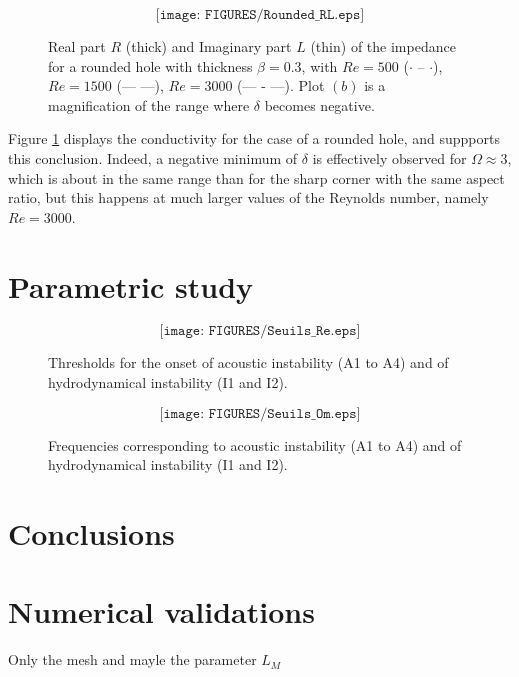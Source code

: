 \documentclass{jfm}
\begin{document}
\begin{figure}
$$
\texttt{[image: FIGURES/Rounded\_RL.eps]}
$$
\caption{ Real part $R$ (thick) and Imaginary part $L$ (thin) of the impedance 
for a rounded hole with thickness $\beta=0.3$, with
$Re = 500$ ($\cdot$ -- $\cdot$), $Re = 1500$ (---  ---), $Re = 3000$ (--- - ---).
Plot $(b)$ is a magnification of the range where $\delta$ becomes negative.
}
\label{fig:CondR}
\end{figure}

Figure \ref{fig:CondR} displays the conductivity for the case of a rounded hole, and suppports this conclusion. Indeed, a negative minimum of $\delta$ is effectively observed for $\Omega \approx 3$, which is about in the same range than for the sharp corner with the same aspect ratio, but this happens at much larger values of the Reynolds number, namely $Re = 3000$.



\section{Parametric study}

\begin{figure}
$$
\texttt{[image: FIGURES/Seuils\_Re.eps]}
$$
\caption{ Thresholds for the onset of acoustic instability (A1 to A4) and of hydrodynamical instability (I1 and I2).
}
\label{fig:ThresholdsRe}
\end{figure}

\begin{figure}
$$
\texttt{[image: FIGURES/Seuils\_Om.eps]}
$$
\caption{ Frequencies corresponding to acoustic instability (A1 to A4) and of hydrodynamical instability (I1 and I2).
}
\label{fig:ThresholdsRe}
\end{figure}


\section{Conclusions}


\appendix
\section{Numerical validations}
Only the mesh and mayle the parameter $L_M$






\end{document}
